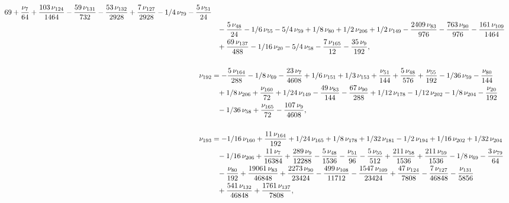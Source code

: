 \documentclass[a4paper,12pt, DIV=14, BCOR=5mm, twoside, headsepline, numbers=noenddot]{scrbook}
\begin{document}
\begin{align}
\begin{aligned}
{{69}}+{\frac {\nu_{{7}}}{64}}+{\frac {103\,\nu_{{124}}}{1464}}-{\frac {
59\,\nu_{{131}}}{732}}-{\frac {53\,\nu_{{132}}}{2928}}+{\frac {7\,\nu_
{{127}}}{2928}}-1/4\,\nu_{{79}}-{\frac {5\,\nu_{{51}}}{24}}\\
 &\hphantom{=}-{\frac {5
\,\nu_{{48}}}{24}}-1/6\,\nu_{{55}}-5/4\,\nu_{{59}}+1/8\,\nu_{{80}}+1/2
\,\nu_{{206}}+1/2\,\nu_{{149}}-{\frac {2409\,\nu_{{83}}}{976}}-{\frac 
{763\,\nu_{{90}}}{976}}-{\frac {161\,\nu_{{109}}}{1464}}\\
 &\hphantom{=}+{\frac {69\,
\nu_{{137}}}{488}}-1/16\,\nu_{{20}}-5/4\,\nu_{{58}}-{\frac {7\,\nu_{{
165}}}{12}}-{\frac {35\,\nu_{{9}}}{192}}, \\
\\
\nu_{{192}}&=-{\frac {5\,\nu_{
{164}}}{288}}-1/8\,\nu_{{69}}-{\frac {23\,\nu_{{7}}}{4608}}+1/6\,\nu_{
{151}}+1/3\,\nu_{{153}}+{\frac {\nu_{{51}}}{144}}+{\frac {5\,\nu_{{48}
}}{576}}+{\frac {\nu_{{55}}}{192}}-1/36\,\nu_{{59}}-{\frac {\nu_{{80}}
}{144}}\\
 &\hphantom{=}+1/8\,\nu_{{206}}+{\frac {\nu_{{160}}}{72}}+1/24\,\nu_{{149}}-{
\frac {49\,\nu_{{83}}}{144}}-{\frac {67\,\nu_{{90}}}{288}}+1/12\,\nu_{
{178}}-1/12\,\nu_{{202}}-1/8\,\nu_{{204}}-{\frac {\nu_{{20}}}{192}}\\
 &\hphantom{=}-1/
36\,\nu_{{58}}+{\frac {\nu_{{165}}}{72}}-{\frac {107\,\nu_{{9}}}{4608}
}, \\
\\
\nu_{{193}}&=-1/16\,\nu_{{160}}+{\frac {11\,\nu_{{164}}}{192}}+1/24\,
\nu_{{165}}+1/8\,\nu_{{178}}+1/32\,\nu_{{181}}-1/2\,\nu_{{194}}+1/16\,
\nu_{{202}}+1/32\,\nu_{{204}}\\
 &\hphantom{=}-1/16\,\nu_{{206}}+{\frac {11\,\nu_{{7}}
}{16384}}+{\frac {289\,\nu_{{9}}}{12288}}-{\frac {5\,\nu_{{48}}}{1536}
}-{\frac {\nu_{{51}}}{96}}-{\frac {5\,\nu_{{55}}}{512}}+{\frac {211\,
\nu_{{58}}}{1536}}+{\frac {211\,\nu_{{59}}}{1536}}-1/8\,\nu_{{69}}-{
\frac {3\,\nu_{{79}}}{64}}\\
 &\hphantom{=}-{\frac {\nu_{{80}}}{192}}+{\frac {19061\,
\nu_{{83}}}{46848}}+{\frac {2273\,\nu_{{90}}}{23424}}-{\frac {499\,\nu
_{{108}}}{11712}}-{\frac {1547\,\nu_{{109}}}{23424}}+{\frac {47\,\nu_{
{124}}}{7808}}-{\frac {7\,\nu_{{127}}}{46848}}-{\frac {\nu_{{131}}}{
5856}}\\
 &\hphantom{=}+{\frac {541\,\nu_{{132}}}{46848}}+{\frac {1761\,\nu_{{137}}}{
7808}}, 
\end{aligned}
\end{align}
\end{document}
